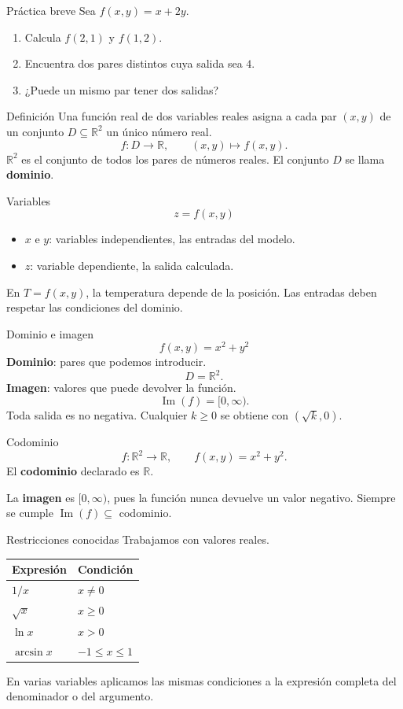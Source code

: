 \begin{frame}{Práctica breve}
Sea $f(x,y)=x+2y$.
\begin{enumerate}
\item Calcula $f(2,1)$ y $f(1,2)$.
\item Encuentra dos pares distintos cuya salida sea $4$.
\item ¿Puede un mismo par tener dos salidas?
\end{enumerate}
\end{frame}
\begin{frame}{Definición}
Una función real de dos variables reales asigna a cada par $(x,y)$ de un conjunto $D\subseteq\mathbb R^2$ un único número real.
\[f:D\longrightarrow\mathbb R,\qquad (x,y)\longmapsto f(x,y).\]
$\mathbb R^2$ es el conjunto de todos los pares de números reales.
\medskip
El conjunto $D$ se llama \textbf{dominio}.
\end{frame}
\begin{frame}{Variables}
\[z=f(x,y)\]
\begin{itemize}
\item $x$ e $y$: variables independientes, las entradas del modelo.
\item $z$: variable dependiente, la salida calculada.
\end{itemize}
En $T=f(x,y)$, la temperatura depende de la posición.
\medskip
Las entradas deben respetar las condiciones del dominio.
\end{frame}
\begin{frame}{Dominio e imagen}
\[f(x,y)=x^2+y^2\]
\textbf{Dominio}: pares que podemos introducir.
\[D=\mathbb R^2.\]
\textbf{Imagen}: valores que puede devolver la función.
\[\operatorname{Im}(f)=[0,\infty).\]
Toda salida es no negativa. Cualquier $k\ge0$ se obtiene con $(\sqrt{k},0)$.
\end{frame}
\begin{frame}{Codominio}
\[f:\mathbb R^2\longrightarrow\mathbb R,\qquad f(x,y)=x^2+y^2.\]
El \textbf{codominio} declarado es $\mathbb R$.

La \textbf{imagen} es $[0,\infty)$, pues la función nunca devuelve un valor negativo.
\medskip
Siempre se cumple $\operatorname{Im}(f)\subseteq$ codominio.
\end{frame}
\begin{frame}{Restricciones conocidas}
Trabajamos con valores reales.
\begin{center}\begin{tabular}{ll}
Expresión & Condición\\\hline
$1/x$ & $x\ne0$\\[3mm]
$\sqrt{x}$ & $x\ge0$\\[3mm]
$\ln x$ & $x>0$\\[3mm]
$\arcsin x$ & $-1\le x\le1$
\end{tabular}\end{center}
En varias variables aplicamos las mismas condiciones a la expresión completa del denominador o del argumento.
\end{frame}
